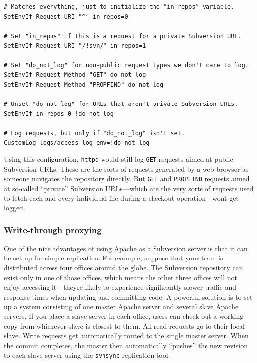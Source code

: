\begin{verbatim}
# Matches everything, just to initialize the "in_repos" variable.
SetEnvIf Request_URI "^" in_repos=0

# Set "in_repos" if this is a request for a private Subversion URL.
SetEnvIf Request_URI "/!svn/" in_repos=1

# Set "do_not_log" for non-public request types we don't care to log.
SetEnvIf Request_Method "GET" do_not_log
SetEnvIf Request_Method "PROPFIND" do_not_log

# Unset "do_not_log" for URLs that aren't private Subversion URLs.
SetEnvIf in_repos 0 !do_not_log

# Log requests, but only if "do_not_log" isn't set.
CustomLog logs/access_log env=!do_not_log
\end{verbatim}

Using this configuration, \texttt{httpd} would still log \texttt{GET}
requests aimed at public Subversion URLs. These are the sorts of
requests generated by a web browser as someone navigates the repository
directly. But \texttt{GET} and \texttt{PROPFIND} requests aimed at
so-called ``private'' Subversion URLs---which are the very sorts of
requests used to fetch each and every individual file during a checkout
operation---won\textquotesingle t get logged.

\subsubsection{Write-through
proxying}\label{svn.serverconfig.httpd.extra.writethruproxy}

One of the nice advantages of using Apache as a Subversion server is
that it can be set up for simple replication. For example, suppose that
your team is distributed across four offices around the globe. The
Subversion repository can exist only in one of those offices, which
means the other three offices will not enjoy accessing
it---they\textquotesingle re likely to experience significantly slower
traffic and response times when updating and committing code. A powerful
solution is to set up a system consisting of one master Apache server
and several slave Apache servers. If you place a slave server in each
office, users can check out a working copy from whichever slave is
closest to them. All read requests go to their local slave. Write
requests get automatically routed to the single master server. When the
commit completes, the master then automatically ``pushes'' the new
revision to each slave server using the \texttt{svnsync} replication
tool.

